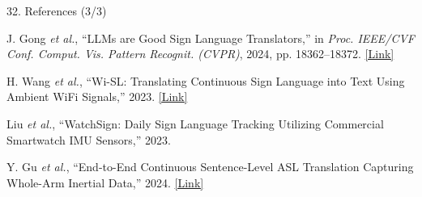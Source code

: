 \documentclass[aspectratio=169,11pt]{beamer}
\begin{document}
\begin{frame}{32. References (3/3)}

\footnotesize
\color{black}
\raggedright

\begin{list}
    {}
    {
        \setlength{\leftmargin}{0.45cm}
        \setlength{\labelwidth}{0cm}
        \setlength{\labelsep}{0.10cm}
        \setlength{\itemsep}{8pt}
        \setlength{\parsep}{0pt}
        \setlength{\topsep}{0pt}
    }

\item[\textbf{[9]}]
J. Gong \emph{et al.}, ``LLMs are Good Sign Language Translators,''
in \emph{Proc. IEEE/CVF Conf. Comput. Vis. Pattern Recognit. (CVPR)},
2024, pp. 18362--18372.
\hspace{2pt}
\href{https://openaccess.thecvf.com/content/CVPR2024/html/Gong_LLMs_are_Good_Sign_Language_Translators_CVPR_2024_paper.html}
{\textcolor{AmritaMaroon}{[Link]}}

\item[\textbf{[10]}]
H. Wang \emph{et al.}, ``Wi-SL: Translating Continuous Sign Language
into Text Using Ambient WiFi Signals,'' 2023.
\hspace{2pt}
\href{https://www.mdpi.com/1424-8220/20/14/4025}
{\textcolor{AmritaMaroon}{[Link]}}

\item[\textbf{[11]}]
Liu \emph{et al.}, ``WatchSign: Daily Sign Language Tracking Utilizing
Commercial Smartwatch IMU Sensors,'' 2023.

\item[\textbf{[12]}]
Y. Gu \emph{et al.}, ``End-to-End Continuous Sentence-Level ASL
Translation Capturing Whole-Arm Inertial Data,'' 2024.
\hspace{2pt}
\href{https://www.mdpi.com/1424-8220/24/2/453}
{\textcolor{AmritaMaroon}{[Link]}}

\end{list}

\end{frame}
\end{document}

